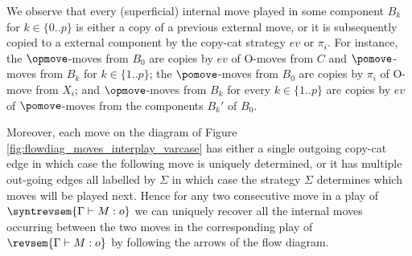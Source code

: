     We observe that every (superficial) internal move played in some component $B_k$ for $k\in \{0..p\}$ is either a copy of a previous external move, or it is subsequently copied to a external component by the copy-cat strategy $ev$ or $\pi_i$.  For instance, the $\opmove$-moves from $B_0$ are copies by $ev$ of O-moves from $C$ and $\pomove$-moves from $B_k$ for $k \in \{1..p\}$; the $\pomove$-moves from $B_0$ are copies by $\pi_i$ of O-move from $X_i$; and $\opmove$-moves from $B_k$ for every $k \in \{1..p\}$ are copies by $ev$ of $\pomove$-moves from the components $B_k'$ of $B_0$.

    Moreover, each move on the diagram of Figure \ref{fig:flowdiag_moves_interplay_varcase} has either a single outgoing copy-cat edge in which case the following move is uniquely determined, or it has multiple out-going edges all labelled by $\Sigma$ in which case the strategy $\Sigma$ determines which moves will be played next.
    Hence for any two consecutive move in a play of $\syntrevsem{\Gamma \vdash M : o}$ we can uniquely recover all the internal moves occurring between the two moves in the corresponding play of $\revsem{\Gamma \vdash M : o}$ by following the arrows of the flow diagram.
